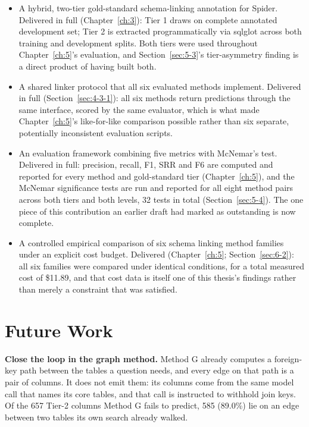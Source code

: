 \begin{itemize}
\item
  A hybrid, two-tier gold-standard schema-linking annotation for Spider. Delivered in full (Chapter~\ref{ch:3}): Tier 1 draws on \citet{taniguchi2021} complete annotated development set; Tier 2 is extracted programmatically via sqlglot across both training and development splits. Both tiers were used throughout Chapter~\ref{ch:5}'s evaluation, and Section~\ref{sec:5-3}'s tier-asymmetry finding is a direct product of having built both.
\item
  A shared linker protocol that all six evaluated methods implement. Delivered in full (Section~\ref{sec:4-3-1}): all six methods return predictions through the same interface, scored by the same evaluator, which is what made Chapter~\ref{ch:5}'s like-for-like comparison possible rather than six separate, potentially inconsistent evaluation scripts.
\item
  An evaluation framework combining five metrics with McNemar's test. Delivered in full: precision, recall, F1, SRR and F6 are computed and reported for every method and gold-standard tier (Chapter~\ref{ch:5}), and the McNemar significance tests are run and reported for all eight method pairs across both tiers and both levels, 32 tests in total (Section~\ref{sec:5-4}). The one piece of this contribution an earlier draft had marked as outstanding is now complete.
\item
  A controlled empirical comparison of six schema linking method families under an explicit cost budget. Delivered (Chapter~\ref{ch:5}; Section~\ref{sec:6-2}): all six families were compared under identical conditions, for a total measured cost of \$11.89, and that cost data is itself one of this thesis's findings rather than merely a constraint that was satisfied.
\end{itemize}

\section{Future Work}\label{sec:7-3}

\textbf{Close the loop in the graph method.} Method G already computes a foreign-key path between the tables a question needs, and every edge on that path is a pair of columns. It does not emit them: its columns come from the same model call that names its core tables, and that call is instructed to withhold join keys. Of the 657 Tier-2 columns Method G fails to predict, 585 (89.0\%) lie on an edge between two tables its own search already walked.

